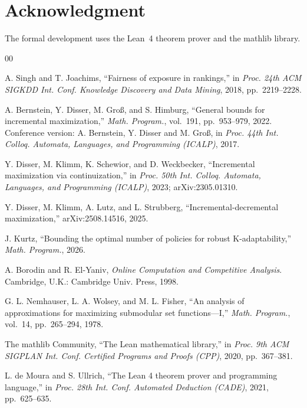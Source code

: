 \documentclass[conference]{IEEEtran}
\theoremstyle{definition}
\begin{document}
\section*{Acknowledgment}

The formal development uses the Lean~4 theorem prover and the mathlib library.

\begin{thebibliography}{00}

 A. Singh and T. Joachims, ``Fairness of exposure in rankings,'' in
\emph{Proc. 24th ACM SIGKDD Int. Conf. Knowledge Discovery and Data Mining}, 2018,
pp.~2219--2228.

 A. Bernstein, Y. Disser, M. Gro\ss{}, and S. Himburg, ``General
bounds for incremental maximization,'' \emph{Math. Program.}, vol.~191, pp.~953--979, 2022.
Conference version: A. Bernstein, Y. Disser and M. Gro\ss{}, in \emph{Proc. 44th Int. Colloq.
Automata, Languages, and Programming (ICALP)}, 2017.

 Y. Disser, M. Klimm, K. Schewior, and D. Weckbecker, ``Incremental
maximization via continuization,'' in \emph{Proc. 50th Int. Colloq. Automata, Languages, and
Programming (ICALP)}, 2023; arXiv:2305.01310.

 Y. Disser, M. Klimm, A. Lutz, and L. Strubberg,
``Incremental-decremental maximization,'' arXiv:2508.14516, 2025.

 J. Kurtz, ``Bounding the optimal number of policies for robust
K-adaptability,'' \emph{Math. Program.}, 2026.

 A. Borodin and R. El-Yaniv, \emph{Online Computation and Competitive
Analysis}. Cambridge, U.K.: Cambridge Univ. Press, 1998.

 G. L. Nemhauser, L. A. Wolsey, and M. L. Fisher, ``An analysis of
approximations for maximizing submodular set functions---I,'' \emph{Math. Program.},
vol.~14, pp.~265--294, 1978.

 The mathlib Community, ``The Lean mathematical library,'' in
\emph{Proc. 9th ACM SIGPLAN Int. Conf. Certified Programs and Proofs (CPP)}, 2020,
pp.~367--381.

 L. de Moura and S. Ullrich, ``The Lean 4 theorem prover and
programming language,'' in \emph{Proc. 28th Int. Conf. Automated Deduction (CADE)}, 2021,
pp.~625--635.

\end{thebibliography}


\end{document}
